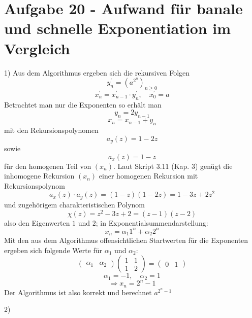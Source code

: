 \section*{Aufgabe 20 - Aufwand für banale und schnelle Exponentiation im
Vergleich}
\begin{paragraph}{1)}
  Aus dem Algorithmus ergeben sich die rekursiven Folgen
  \[ y_{n}^{'} = (a^{2^{n}})_{n\geq 0} \]
  \[ x_{n}^{'} = x_{n-1}^{'} \cdot y_{n}^{'}, \quad x_{0}^{'} = a \]
  Betrachtet man nur die Exponenten so erhält man
  \[ y_{n} = 2y_{n-1} \]
  \[ x_{n} = x_{n-1} + y_{n} \]
  mit den Rekursionspolynomen
  \[ a_{y}(z) = 1 - 2z \]
  sowie
  \[ a_{x}(z) = 1 - z \]
  für den homogenen Teil von $(x_{n})$.
  Laut Skript $3.11$ (Kap. $3$) genügt die inhomogene Rekursion $(x_{n})$ einer
  homogenen Rekursion mit Rekursionspolynom
  \[ a_{x}(z) \cdot a_{y}(z) = (1 - z)(1 - 2z) = 1 - 3z + 2z^{2} \]
  und zugehörigem charakteristischen Polynom
  \[ \chi(z)= z^{2} - 3z + 2 = (z - 1)(z - 2) \]
  also den Eigenwerten $1$ und $2$; in Exponentialsummendarstellung:
  \[ x_{n} = \alpha_{1}1^{n} + \alpha_{2}2^{n} \]
  Mit den aus dem Algorithmus offensichtlichen Startwerten für die Exponenten
  ergeben sich folgende Werte für $\alpha_{1}$ und $\alpha_{2}$:
  \[ \begin{pmatrix} \alpha_{1} & \alpha_{2} \end{pmatrix} 
     \begin{pmatrix} 1 & 1 \\ 1 & 2 \end{pmatrix} = \begin{pmatrix} 0 & 1
     \end{pmatrix} \]
  \[ \alpha_{1} = -1, \quad \alpha_{2} = 1 \]
  \[ \Rightarrow x_{n} = 2^{n} - 1 \]
  Der Algorithmus ist also korrekt und berechnet $a^{2^{n}-1}$
\end{paragraph}
\begin{paragraph}{2)}

\end{paragraph}
